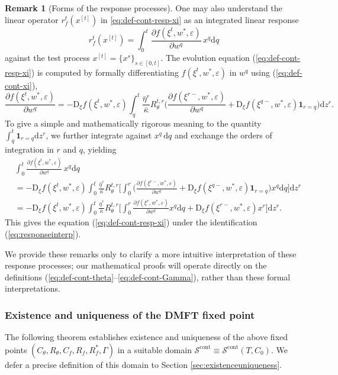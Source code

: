 \documentclass[11pt,letterpaper,reqno]{amsart}
\theoremstyle{definition}
\newtheorem{remark}[thm]{Remark}
\def\eps{\varepsilon}
\def\d{\mathrm{d}}
\def\D{\mathrm{D}}
\def\cS{\mathcal{S}}
\def\1{\mathbf{1}}
\begin{document}
\begin{remark}[Forms of the response processes]
One may also understand the linear operator $r_f^t(x^{[t]})$
in \eqref{eq:def-cont-resp-xi} as an integrated linear response
\begin{equation}\label{eq:responseinterp}
r_f^t(x^{[t]})
=\int_0^t \frac{\partial f(\xi^t,w^*,\eps)}{\partial w^q}\,x^q \d q
\end{equation}
against the test process $x^{[t]}=\{x^s\}_{s \in [0,t]}$.
The evolution equation (\ref{eq:def-cont-resp-xi}) is computed by formally
differentiating $f(\xi^t,w^*,\eps)$ in $w^q$ using (\ref{eq:def-cont-xi}),
\[\frac{\partial f(\xi^t,w^*,\eps)}{\partial w^q}
={-}\D_\xi f(\xi^t,w^*,\eps) \int_q^t \frac{\bar\eta^r}{\bar\kappa}
R_\theta^{t,r}\bigg(\frac{\partial f(\xi^{r-},w^*,\eps)}{\partial
w^q}+\D_\xi f(\xi^{q-},w^*,\eps)\1_{r=q}\bigg)\d z^r.\]
To give a simple and mathematically rigorous meaning to the quantity
$\int_q^t \1_{r=q} \d z^r$, we further integrate against $x^q\,\d q$ and
exchange the orders of integration in $r$ and $q$, yielding
\begin{align*}
&\int_0^t \frac{\partial f(\xi^t,w^*,\eps)}{\partial w^q}\,x^q\d q\\
&={-}\D_\xi f(\xi^t,w^*,\eps)\int_0^t\frac{\bar\eta^r}{\bar\kappa}
R_\theta^{t,r}\Bigg[\int_0^r \bigg(\frac{\partial f(\xi^{r-},w^*,\eps)}{\partial
w^q}+\D_\xi f(\xi^{q-},w^*,\eps)\1_{r=q}\bigg)x^q\d q\Bigg]\d z^r\\
&={-}\D_\xi f(\xi^t,w^*,\eps)\int_0^t\frac{\bar\eta^r}{\bar\kappa}
R_\theta^{t,r}\Bigg[\int_0^r \frac{\partial f(\xi^r,w^*,\eps)}{\partial
w^q}x^q\d q+\D_\xi f(\xi^{r-},w^*,\eps)x^r\Bigg]\d z^r.
\end{align*}
This gives the equation (\ref{eq:def-cont-resp-xi}) under the identification
(\ref{eq:responseinterp}).

We provide these remarks only to clarify a more intuitive interpretation of
these response processes; our mathematical proofs will operate directly on the
definitions (\ref{eq:def-cont-theta}--\ref{eq:def-cont-Gamma}),
rather than these formal interpretations.
\end{remark}

\subsubsection{Existence and uniqueness of the DMFT fixed point}

The following theorem establishes existence and
uniqueness of the above fixed points $(C_\theta,R_\theta,C_f,R_f,R_f^*,\Gamma)$ 
in a suitable domain $\cS^\text{cont} \equiv \cS^\text{cont}(T,C_0)$.
We defer a precise definition of this
domain to Section \ref{sec:existenceuniqueness}.
\end{document}
